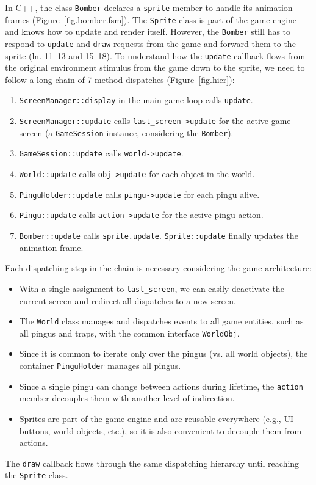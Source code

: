 \documentclass{vgtc}                          %
\newcommand{\code}[1] {{\small{\texttt{#1}}}}
\begin{document}
In C++, the class \code{Bomber} declares a \code{sprite} member to handle its
animation frames (Figure~\ref{fig.bomber.fsm}).
%
The \code{Sprite} class is part of the game engine and knows how to update and
render itself.
However, the \code{Bomber} still has to respond to \code{update} and
\code{draw} requests from the game and forward them to the sprite
(ln. 11--13 and 15--18).
%
To understand how the \code{update} callback flows from the original
environment stimulus from the game down to the sprite, we need to follow a long
chain of 7 method dispatches (Figure~\ref{fig.hier}):
%
\begin{enumerate}
\item \code{ScreenManager::display} in the main game loop calls \code{update}.
\item \code{ScreenManager::update} calls \code{last\_screen->update} for the
      active game screen (a \code{GameSession} instance, considering the
      \code{Bomber}).
\item \code{GameSession::update} calls \code{world->update}.
\item \code{World::update} calls \code{obj->update} for each object in the
      world.
\item \code{PinguHolder::update} calls \code{pingu->update} for each pingu
      alive.
\item \code{Pingu::update} calls \code{action->update} for the active pingu
      action.
\item \code{Bomber::update} calls \code{sprite.update}.
      \code{Sprite::update} finally updates the animation frame.
\end{enumerate}
%
Each dispatching step in the chain is necessary considering the game
architecture:
%
\begin{itemize}
\item With a single assignment to \code{last\_screen}, we can easily deactivate
      the current screen and redirect all dispatches to a new screen.
\item The \code{World} class manages and dispatches events to all game
      entities, such as all pingus and traps, with the common interface
      \code{WorldObj}.
\item Since it is common to iterate only over the pingus (vs. all world
      objects), the container \code{PinguHolder} manages all pingus.
\item Since a single pingu can change between actions during lifetime, the
      \code{action} member decouples them with another level of indirection.
\item Sprites are part of the game engine and are reusable everywhere (e.g., UI
      buttons, world objects, etc.), so it is also convenient to decouple them
      from actions.
\end{itemize}
%
The \code{draw} callback flows through the same dispatching hierarchy until
reaching the \code{Sprite} class.
\end{document}
